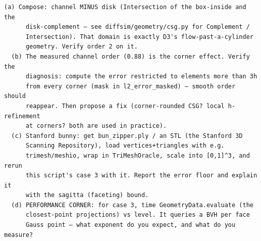 \begin{explore}
\begin{verbatim}
(a) Compose: channel MINUS disk (Intersection of the box-inside and the
      disk-complement — see diffsim/geometry/csg.py for Complement /
      Intersection). That domain is exactly D3's flow-past-a-cylinder
      geometry. Verify order 2 on it.
  (b) The measured channel order (0.88) is the corner effect. Verify the
      diagnosis: compute the error restricted to elements more than 3h
      from every corner (mask in l2_error_masked) — smooth order should
      reappear. Then propose a fix (corner-rounded CSG? local h-refinement
      at corners? both are used in practice).
  (c) Stanford bunny: get bun_zipper.ply / an STL (the Stanford 3D
      Scanning Repository), load vertices+triangles with e.g.
      trimesh/meshio, wrap in TriMeshOracle, scale into [0,1]^3, and rerun
      this script's case 3 with it. Report the error floor and explain it
      with the sagitta (faceting) bound.
  (d) PERFORMANCE CORNER: for case 3, time GeometryData.evaluate (the
      closest-point projections) vs level. It queries a BVH per face
      Gauss point — what exponent do you expect, and what do you measure?
\end{verbatim}
\end{explore}
